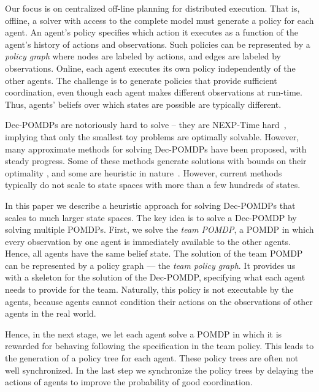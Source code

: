 \documentclass[letterpaper]{article} %
\theoremstyle{definition}
\begin{document}
Our focus is on centralized off-line planning for distributed execution. That is, offline, a solver with access to the complete model must generate a policy for each agent. An agent's policy specifies which action it executes as a function of the agent's history of
actions and observations. Such policies can be represented by a {\em policy graph} where nodes are labeled by actions, and edges are labeled by observations. Online, each agent executes its own policy independently of the other agents.
The challenge is to generate policies that provide sufficient coordination, even though each agent makes different observations at run-time. Thus, agents' beliefs over which states are possible are typically different. 

Dec-POMDPs are notoriously hard to solve -- they are NEXP-Time hard~\cite{DECPOMDPCOMP}, implying that only the smallest toy problems are optimally solvable.
However, many approximate methods for solving Dec-POMDPs have been proposed, with steady progress. Some of these methods generate solutions with bounds on
their optimality \cite{GMAAICE,MBDP,DICEPS}, and some are heuristic in nature~\cite{JESP}. However, current methods typically do not scale to state spaces with more than a few hundreds of states.


In this paper we describe a heuristic approach for solving Dec-POMDPs that scales to much larger state spaces. The key idea is to solve a Dec-POMDP by
solving multiple POMDPs. First, we solve  the {\em team POMDP}, a POMDP in which every observation by one agent is immediately available to the other agents. Hence, all agents have the same belief state.  The solution of the team
POMDP can be represented by a policy graph --- the {\em team policy graph}. It provides us with a skeleton for the solution of the Dec-POMDP, specifying what each agent needs to provide for the team. Naturally, this policy is not executable by the agents, because agents cannot condition their actions on the observations of other agents in the real world.

Hence, in the next stage, we let each agent solve a POMDP in which it is rewarded for behaving following the specification in the team policy. This leads to the generation of a policy tree for each agent. 
These policy trees are often not well synchronized. In the last step we synchronize the policy trees by delaying the actions of agents to improve the probability of good coordination. 
\end{document}
